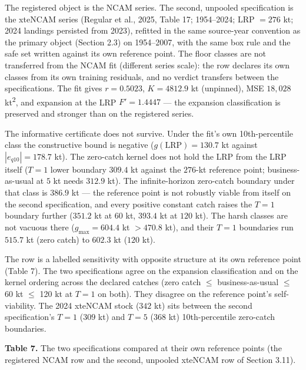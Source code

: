 The registered object is the NCAM series. The second, unpooled
specification is the xteNCAM series (Regular et al., 2025, Table 17;
1954--2024; LRP \(= 276\) kt; 2024 landings persisted from 2023),
refitted in the same source-year convention as the primary object
(Section 2.3) on 1954--2007, with the same box rule and the safe set
written against its own reference point. The floor
classes are not transferred from the NCAM fit (different series scale):
the row declares its own classes from its own training residuals, and no
verdict transfers between the specifications. The fit gives
\(r = 0.5023\), \(K = 4812.9\) kt (unpinned), MSE \(18{,}028\) kt\textsuperscript{2}, and
expansion at the LRP \(F' = 1.4447\) --- the expansion classification is
preserved and stronger than on the registered series.

The informative certificate does not survive. Under the fit's own
10th-percentile class the constructive bound is negative
(\(g(\mathrm{LRP}) = 130.7\) kt against \(|e_{q10}| = 178.7\) kt). The
zero-catch kernel does not hold the LRP from the LRP itself (\(T=1\)
lower boundary \(309.4\) kt against the \(276\)-kt reference point;
business-as-usual at \(5\) kt needs \(312.9\) kt). The infinite-horizon
zero-catch boundary under that class is \(386.9\) kt --- the reference
point is not robustly viable from itself on the second specification,
and every positive constant catch raises the \(T=1\) boundary further
(\(351.2\) kt at \(60\) kt, \(393.4\) kt at \(120\) kt). The harsh
classes are not vacuous there (\(g_{\max} = 604.4\) kt \(> 470.8\) kt),
and their \(T=1\) boundaries run \(515.7\) kt (zero catch) to \(602.3\)
kt (\(120\) kt).

The row is a labelled sensitivity with opposite structure at its own
reference point (Table 7). The two specifications agree on the expansion
classification and on the kernel ordering across the declared catches
(zero catch \ensuremath{\leq} business-as-usual \ensuremath{\leq} 60 kt \ensuremath{\leq} 120 kt at \(T=1\) on both).
They disagree on the reference point's self-viability. The 2024 xteNCAM
stock (\(342\) kt) sits between the second specification's \(T=1\)
(\(309\) kt) and \(T=5\) (\(368\) kt) 10th-percentile zero-catch
boundaries.

\textbf{Table 7.} The two specifications compared at their own reference
points (the registered NCAM row and the second, unpooled xteNCAM row of
Section 3.11).

